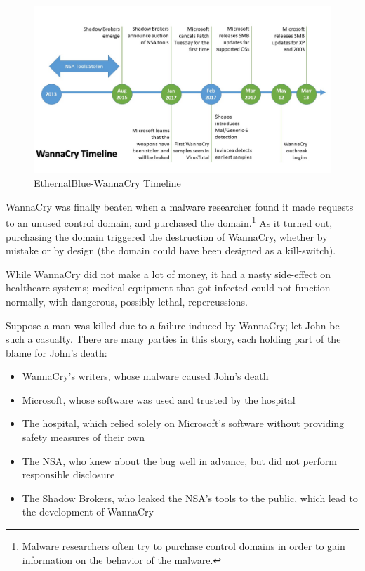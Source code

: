 \begin{figure}[!ht]
    \centering
    \includegraphics[width=\textwidth]{images/EthernalBlue-WannaCry_Timeline.jpg}
    \caption{EthernalBlue-WannaCry Timeline} \label{fig:wannacry_timeline}
\end{figure}

WannaCry was finally beaten when a malware researcher found it made requests to
an unused control domain, and purchased the domain.\footnote{Malware researchers
often try to purchase control domains in order to gain information on the
behavior of the malware.} As it turned out, purchasing the domain triggered the
destruction of WannaCry, whether by mistake or by design (the domain could have
been designed as a kill-switch).

While WannaCry did not make a lot of money, it had a nasty side-effect on
healthcare systems; medical equipment that got infected could not function
normally, with dangerous, possibly lethal, repercussions.

Suppose a man was killed due to a failure induced by WannaCry; let John be such
a casualty. There are many parties in this story, each holding part of the blame
for John's death:
\begin{itemize}
    \item WannaCry's writers, whose malware caused John's death
    \item Microsoft, whose software was used and trusted by the hospital
    \item The hospital, which relied solely on Microsoft's software without
    providing safety measures of their own
    \item The NSA, who knew about the bug well in advance, but did not perform
    responsible disclosure
    \item The Shadow Brokers, who leaked the NSA's tools to the public, which
    lead to the development of WannaCry
\end{itemize}

